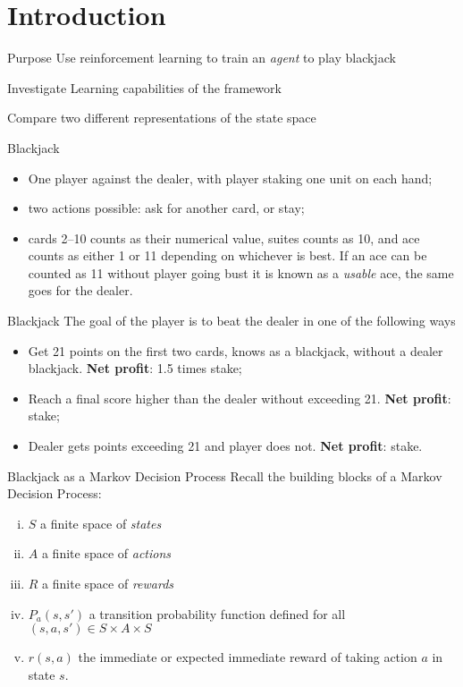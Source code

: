 

\section{Introduction}

\begin{frame}{Purpose}
	Use reinforcement learning to train an \textit{agent} to play blackjack\newline
	
	Investigate Learning capabilities of the framework\newline
		
	Compare two different representations of the state space
\end{frame}

\begin{frame}{Blackjack}
\begin{itemize}
	\item One player against the dealer, with player staking one unit on each hand;
	\item two actions possible: ask for another card, or stay;
	\item cards 2--10 counts as their numerical value, suites counts as 10, and ace counts as either 1 or 11 depending on whichever is best. If an ace can be counted as 11 without player going bust it is known as a \textit{usable} ace, the same goes for the dealer.
\end{itemize}
\end{frame}

\begin{frame}{Blackjack}
	The goal of the player is to beat the dealer in one of the following ways
	\begin{itemize}
		\item Get 21 points on the first two cards, knows as a blackjack, without a dealer blackjack. \textbf{Net profit}: 1.5 times stake;
		\item Reach a final score higher than the dealer without exceeding 21. \textbf{Net profit}: stake;
		\item Dealer gets points exceeding 21 and player does not. \textbf{Net profit}: stake.
	\end{itemize}
\end{frame}

\begin{frame}{Blackjack as a Markov Decision Process}
	Recall the building blocks of a Markov Decision Process:
	\begin{enumerate}[(i)]
		\item  $S$ a finite space of \textit{states}
		\item  $A$ a finite space of \textit{actions}
		\item  $R$ a finite space of \textit{rewards}
		\item  $P_a(s,s')$ a transition probability function defined for all  $(s,a,s') \in S\times A \times S$
		\item  $r(s,a)$ the immediate or expected immediate reward of taking action $a$ in state $s$.
	\end{enumerate}
\end{frame}

